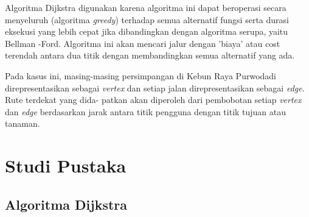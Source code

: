 \documentclass[conference]{IEEEtran}
\begin{document}
    Algoritma Dijkstra digunakan karena algoritma ini dapat
    beroperasi secara menyeluruh (algoritma \emph{greedy}) terhadap
    semua alternatif fungsi serta durasi eksekusi yang lebih cepat
    jika  dibandingkan  dengan  algoritma  serupa,  yaitu  Bellman
    -Ford.  Algoritma  ini  akan  mencari  jalur  dengan  ’biaya’  atau
    cost terendah antara dua titik dengan membandingkan semua
    alternatif yang ada.\par

    Pada kasus ini, masing-masing persimpangan di Kebun
    Raya Purwodadi direpresentasikan sebagai \emph{vertex} dan setiap
    jalan direpresentasikan sebagai \emph{edge}. Rute terdekat yang dida-
    patkan akan diperoleh dari pembobotan setiap \emph{vertex} dan \emph{edge}
    berdasarkan  jarak  antara  titik  pengguna  dengan  titik  tujuan
    atau tanaman.\par

\section{Studi Pustaka}

\subsection{Algoritma Dijkstra}
\end{document}

